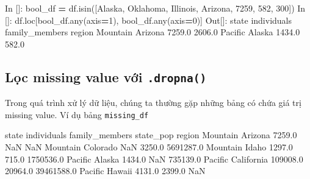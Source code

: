 \documentclass[
]{book}
\newenvironment{Shaded}{\begin{snugshade}}{\end{snugshade}}
\newcommand{\BuiltInTok}[1]{#1}
\newcommand{\DecValTok}[1]{\textcolor[rgb]{0.00,0.00,0.81}{#1}}
\newcommand{\FloatTok}[1]{\textcolor[rgb]{0.00,0.00,0.81}{#1}}
\newcommand{\NormalTok}[1]{#1}
\newcommand{\OperatorTok}[1]{\textcolor[rgb]{0.81,0.36,0.00}{\textbf{#1}}}
\newcommand{\StringTok}[1]{\textcolor[rgb]{0.31,0.60,0.02}{#1}}
\begin{document}
\begin{Shaded}
\begin{Highlighting}[]
\NormalTok{In []: bool\_df }\OperatorTok{=}\NormalTok{ df.isin([}\StringTok{\textquotesingle{}Alaska\textquotesingle{}}\NormalTok{, }\StringTok{\textquotesingle{}Oklahoma\textquotesingle{}}\NormalTok{, }\StringTok{\textquotesingle{}Illinois\textquotesingle{}}\NormalTok{, }\StringTok{\textquotesingle{}Arizona\textquotesingle{}}\NormalTok{, }\DecValTok{7259}\NormalTok{, }\DecValTok{582}\NormalTok{, }\DecValTok{300}\NormalTok{])}
\NormalTok{In []: df.loc[bool\_df.}\BuiltInTok{any}\NormalTok{(axis}\OperatorTok{=}\DecValTok{1}\NormalTok{), bool\_df.}\BuiltInTok{any}\NormalTok{(axis}\OperatorTok{=}\DecValTok{0}\NormalTok{)]}
\NormalTok{Out[]:}
\NormalTok{            state  individuals  family\_members}
\NormalTok{region                                        }
\NormalTok{Mountain  Arizona       }\FloatTok{7259.0}          \FloatTok{2606.0}
\NormalTok{Pacific    Alaska       }\FloatTok{1434.0}           \FloatTok{582.0}
\end{Highlighting}
\end{Shaded}

\hypertarget{lux1ecdc-missing-value-vux1edbi-.dropna}{%
\subsection{\texorpdfstring{Lọc missing value với \texttt{.dropna()}}{Lọc missing value với .dropna()}}\label{lux1ecdc-missing-value-vux1edbi-.dropna}}

Trong quá trình xử lý dữ liệu, chúng ta thường gặp những bảng có chứa giá trị missing value. Ví dụ bảng \texttt{missing\_df}

\begin{Shaded}
\begin{Highlighting}[]
\NormalTok{               state  individuals  family\_members   state\_pop}
\NormalTok{region                                                       }
\NormalTok{Mountain     Arizona       }\FloatTok{7259.0}\NormalTok{             NaN         NaN}
\NormalTok{Mountain    Colorado          NaN          }\FloatTok{3250.0}   \FloatTok{5691287.0}
\NormalTok{Mountain       Idaho       }\FloatTok{1297.0}           \FloatTok{715.0}   \FloatTok{1750536.0}
\NormalTok{Pacific       Alaska       }\FloatTok{1434.0}\NormalTok{             NaN    }\FloatTok{735139.0}
\NormalTok{Pacific   California     }\FloatTok{109008.0}         \FloatTok{20964.0}  \FloatTok{39461588.0}
\NormalTok{Pacific       Hawaii       }\FloatTok{4131.0}          \FloatTok{2399.0}\NormalTok{         NaN}
\end{Highlighting}
\end{Shaded}
\end{document}
